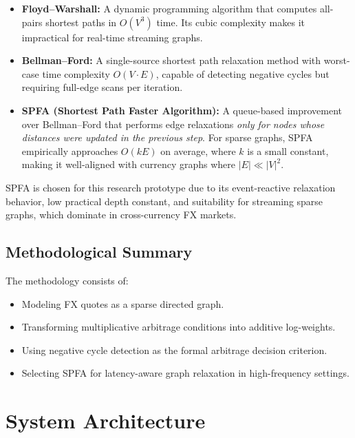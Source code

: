 \documentclass[letterpaper,11pt]{report}
\begin{document}
\begin{itemize}
    \item \textbf{Floyd–Warshall:}  
    A dynamic programming algorithm that computes all-pairs shortest paths in $O(V^3)$ time. Its cubic complexity makes it impractical for real-time streaming graphs.

    \item \textbf{Bellman–Ford:}  
    A single-source shortest path relaxation method with worst-case time complexity $O(V \cdot E)$, capable of detecting negative cycles but requiring full-edge scans per iteration.

    \item \textbf{SPFA (Shortest Path Faster Algorithm):}  
    A queue-based improvement over Bellman–Ford that performs edge relaxations \emph{only for nodes whose distances were updated in the previous step}.  
    For sparse graphs, SPFA empirically approaches $O(kE)$ on average, where $k$ is a small constant, making it well-aligned with currency graphs where $|E| \ll |V|^2$.
\end{itemize}

SPFA is chosen for this research prototype due to its event-reactive relaxation behavior, low practical depth constant, and suitability for streaming sparse graphs, which dominate in cross-currency FX markets.


\section{Methodological Summary}

The methodology consists of:

\begin{itemize}
    \item Modeling FX quotes as a sparse directed graph.
    \item Transforming multiplicative arbitrage conditions into additive log-weights.
    \item Using negative cycle detection as the formal arbitrage decision criterion.
    \item Selecting SPFA for latency-aware graph relaxation in high-frequency settings.
\end{itemize}



\chapter{System Architecture}
\end{document}

